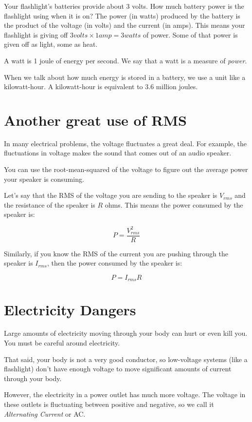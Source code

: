 Your flashlight's batteries provide about 3 volts. How much
battery power is the flashlight using when it is on? The power (in
watts) produced by the battery is the product of the voltage (in
volts) and the current (in amps). This means your flashlight is giving off $3
volts \times 1 amp = 3 watts$ of power. Some of that power is given
off as light, some as heat.

A watt is 1 joule of energy per second. We say that a watt is a
measure of \textit{power}.

When we talk about how much energy is stored in a battery, we use a
unit like a kilowatt-hour. A kilowatt-hour is equivalent to 3.6 million
joules.

\section{Another great use of RMS}

In many electrical problems, the voltage fluctuates a great deal.  For
example, the fluctuations in voltage makes the sound that comes out of an
audio speaker.

You can use the root-mean-squared of the voltage to figure out the average power
your speaker is consuming.

Let's say that the RMS of the voltage you are sending to the speaker is $V_{rms}$
and the resistance of the speaker is $R$ ohms. This means the power consumed
by the speaker is:

$$P = \frac{V_{rms}^2}{R}$$

Similarly, if you know the RMS of the current you are pushing through
the speaker is $I_{rms}$, then the power consumed by the speaker is:

$$P = I_{rms} R$$

\section{Electricity Dangers}

Large amounts of electricity moving through your body can hurt or even kill
you. You must be careful around electricity.

That said, your body is not a very good conductor, so low-voltage
systems (like a flashlight) don't have enough voltage to move significant amounts of
current through your body.

However, the  electricity in a power outlet has much more voltage. The voltage
in these outlets is fluctuating between positive and negative, so we
call it \textit{Alternating Current} or AC.

